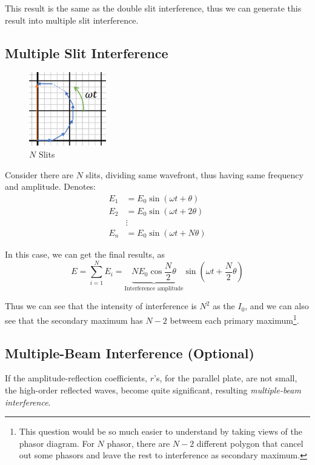 \documentclass[openany]{book}
\begin{document}
This result is the same as the double slit interference, thus we can generate this result into multiple slit interference.
\subsection{Multiple Slit Interference}
\begin{figure}
  \vspace{-20pt}
  \begin{center}
    \includegraphics[width=0.3\textwidth]{Figure/Phasor_2.PNG}
  \end{center}  
  \vspace{-20pt}
  \caption{$N$ Slits}
  \vspace{-70pt}
  \label{fig:Phasor Diagram2}
\end{figure}
Consider there are $N$ slits, dividing same wavefront, thus having same frequency and amplitude. Denotes:
\begin{align*}
E_1&=E_0\sin \left(\omega t+\theta\right)\\
E_2&=E_0\sin \left(\omega t+2\theta \right)\\
&\vdots\\
E_n&=E_0\sin \left(\omega t+N\theta \right)
\end{align*}

In this case, we can get the final results, as 
\[E=\sum _{i=1}^{N}E_i=\underbrace{NE_0\cos \frac{N}{2}\theta }_\text{Interference amplitude}\sin \left(\omega t+\frac{N}{2}\theta\right)\]

Thus we can see that the intensity of interference is $N^2$ as the $I_0$, and we can also see that the secondary maximum has $N-2$ betweem each primary maximum\footnote{This question would be so much easier to understand by taking views of the phasor diagram. For $N$ phasor, there are $N-2$ different polygon that cancel out some phasors and leave the rest to interference as secondary maximum.}.

\subsection{Multiple-Beam Interference (Optional)}
If the amplitude-reflection coefficients, $r$'s, for the parallel plate, are not small, the high-order reflected waves, become quite significant, resulting \emph{multiple-beam interference}.
\end{document}
